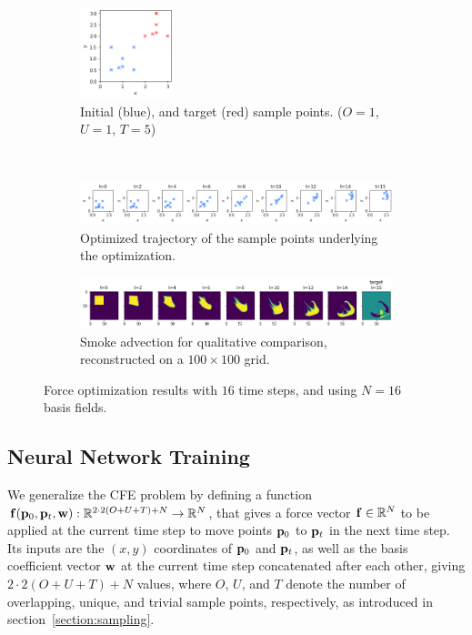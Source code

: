 \begin{figure}
  \centering
  \begin{subfigure}{\textwidth}
    \centering
    \includegraphics[width=0.3\textwidth]{figures/f-optim/blue_start_red_target.png}
    \caption{Initial (blue), and target (red) sample points. ($O=1$, $U=1$,
    $T=5$)}
  \end{subfigure}\\
  \begin{subfigure}{\textwidth}
    \centering
    \includegraphics[width=\textwidth]{figures/f-optim/trajectory_horizontal.png}
    \caption{Optimized trajectory of the sample points underlying the
    optimization.}
  \end{subfigure}\par\medskip
  \begin{subfigure}{\textwidth}
    \centering
    \includegraphics[width=\textwidth]{figures/f-optim/smoke_trajectory_horizontal.png}
    \caption{Smoke advection for qualitative comparison, reconstructed on
    a $100\times 100$ grid.}
  \end{subfigure}\par\medskip
  \caption{Force optimization results with $16$ time steps, and using $N=16$
  basis fields.}
  \label{fig:f_optim}
\end{figure}

\pagebreak
\subsection{Neural Network Training}\label{section:nn-training}
We generalize the \acf{CFE} problem by defining a function
$\vb{f}(\vb{p}_0,\vb{p}_t,\vb{w}): \mathbb{R}^{2\cdot2(O+U+T)+N}\to
\mathbb{R}^N$, that gives a force vector $\vb{f} \in \mathbb{R}^N$ to be
applied at the current time step to move points $\vb{p}_0$ to $\vb{p}_t$ in the
next time step. Its inputs are the $(x,y)$ coordinates of $\vb{p}_0$ and
$\vb{p}_t$, as well as the basis coefficient vector $\vb{w}$ at the current
time step concatenated after each other, giving $2\cdot2(O+U+T)+N$ values, where
$O$, $U$, and $T$ denote the number of overlapping, unique, and trivial sample
points, respectively, as introduced in section~\ref{section:sampling}.

